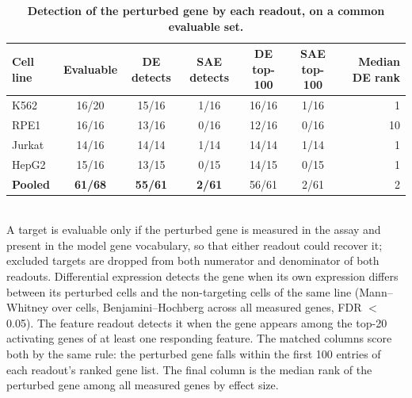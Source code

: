 \begin{table}[htbp]
\centering
\caption{\textbf{Detection of the perturbed gene by each readout, on a common evaluable set.}}
\label{tab:self_detection}
\smallskip
\small
\begin{tabular}{lcccccr}
\toprule
Cell line & Evaluable & DE detects & SAE detects & DE top-100 & SAE top-100 & Median DE rank \\
\midrule
K562 & 16/20 & 15/16 & 1/16 & 16/16 & 1/16 & 1 \\
RPE1 & 16/16 & 13/16 & 0/16 & 12/16 & 0/16 & 10 \\
Jurkat & 14/16 & 14/14 & 1/14 & 14/14 & 1/14 & 1 \\
HepG2 & 15/16 & 13/15 & 0/15 & 14/15 & 0/15 & 1 \\
\midrule
\textbf{Pooled} & \textbf{61/68} & \textbf{55/61} & \textbf{2/61} & 56/61 & 2/61 & 2 \\
\bottomrule
\end{tabular}
\\[2pt]
\footnotesize A target is evaluable only if the perturbed gene is measured in the assay and present in the model gene vocabulary, so that either readout could recover it; excluded targets are dropped from both numerator and denominator of both readouts. Differential expression detects the gene when its own expression differs between its perturbed cells and the non-targeting cells of the same line (Mann--Whitney over cells, Benjamini--Hochberg across all measured genes, FDR $<$ 0.05). The feature readout detects it when the gene appears among the top-20 activating genes of at least one responding feature. The matched columns score both by the same rule: the perturbed gene falls within the first 100 entries of each readout's ranked gene list. The final column is the median rank of the perturbed gene among all measured genes by effect size.
\end{table}
